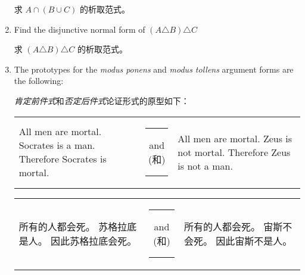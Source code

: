 \begin{enumerate}
    求 $A \cap (B \cup C)$ 的析取范式。
    
    \wbvfill
    
    \workbookpagebreak
    
    \item  Find the disjunctive normal form of $(A \triangle B) \triangle C$
    
    求 $(A \triangle B) \triangle C$ 的析取范式。
    
    
    \wbvfill
    
    \item The prototypes for the \emph{modus ponens} and \emph{modus tollens}
    argument forms are the following:
    
    \emph{肯定前件式}和\emph{否定后件式}论证形式的原型如下：
    
    \begin{tabular}{lcl}
    \begin{minipage}{.3\textwidth}All men are mortal.
    \newline %
    Socrates is a man. \newline
    Therefore Socrates is mortal.\end{minipage} & \rule{16pt}{0pt} and (和) \rule{16pt}{0pt} & %
     \begin{minipage}{.3\textwidth}All men are mortal.
    \newline %
    Zeus is not mortal. \newline
    Therefore Zeus is not a man.\end{minipage}
    \end{tabular}
    
    \begin{tabular}{lcl}
    \begin{minipage}{.3\textwidth}所有的人都会死。\newline %
    苏格拉底是人。\newline
    因此苏格拉底会死。\end{minipage} & \rule{16pt}{0pt} and (和) \rule{16pt}{0pt} & %
     \begin{minipage}{.3\textwidth}所有的人都会死。\newline %
    宙斯不会死。\newline
    因此宙斯不是人。\end{minipage}
    \end{tabular}
    

\end{enumerate}
